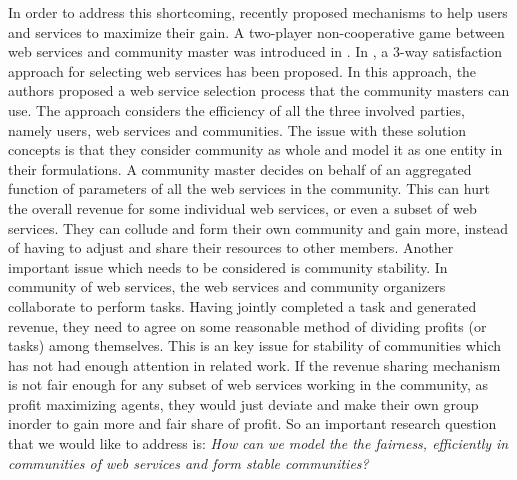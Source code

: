 In order to address this shortcoming, recently \cite{DBLP:conf/IEEEscc/LimTMB12,
DBLP:conf/IEEEscc/KhosravifarABT11, 10.1109/TSC.2012.12} proposed mechanisms to help
users and services to maximize their gain. A two-player
non-cooperative game between web services and community master was
introduced in \cite{DBLP:conf/IEEEscc/KhosravifarABT11}.
In \cite{DBLP:conf/IEEEscc/LimTMB12}, a 3-way satisfaction approach
for selecting web services has been proposed. In this approach,
the authors proposed a web service selection process that the
community masters can use. The approach considers the efficiency
of all the three involved parties, namely users, web services and
communities. The issue with these solution concepts is that they consider community as whole and model it as one entity in their formulations. A community master decides on behalf of an aggregated function of parameters of all the web services in the community. This can hurt the overall revenue for some individual web services, or even a subset of web services. They can collude and form their own community and gain more, instead of having to adjust and share their resources to other members. Another important issue which needs to be considered is community stability. In community of web services, the web services and community organizers collaborate to perform tasks. Having jointly completed a task and generated revenue, they need to agree on some reasonable method of dividing profits (or tasks) among themselves. This is an key issue for stability of communities which has not had enough attention in related work. If the revenue sharing mechanism is not fair enough for any subset of web services working in the community, as profit maximizing agents, they would just deviate and make their own group inorder to gain more and fair share of profit.
So an important research question that we would like to address is:
\emph{How can we model the the fairness, efficiently in communities of web services and form stable communities?}


